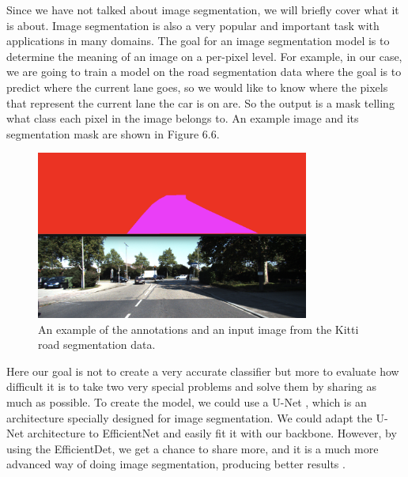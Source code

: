 Since we have not talked about image segmentation, we will briefly cover what it is about.
Image segmentation is also a very popular and important task with applications in many domains.
The goal for an image segmentation model is to determine the meaning of an image on a per-pixel level.
For example, in our case, we are going to train a model on the road segmentation data where the goal is to predict where the current lane goes, so we would like to know where the pixels that represent the current lane the car is on are.
So the output is a mask telling what class each pixel in the image belongs to.
An example image and its segmentation mask are shown in Figure 6.6.

\begin{figure}[h!] 
\centering 
\includegraphics[width=0.8\textwidth]{imgs/segmentation-example.png}
\caption{An example of the annotations and an input image from the Kitti \citep{kitti} road segmentation data.}
\end{figure}

Here our goal is not to create a very accurate classifier but more to evaluate how difficult it is to take two very special problems and solve them by sharing as much as possible.
To create the model, we could use a U-Net \citep{unet}, which is an architecture specially designed for image segmentation.
We could adapt the U-Net architecture to EfficientNet and easily fit it with our backbone.
However, by using the EfficientDet, we get a chance to share more, and it is a much more advanced way of doing image segmentation, producing better results \citep{efficientDet}.

